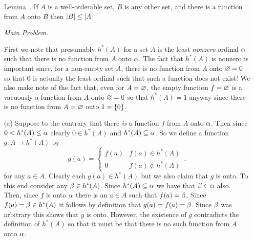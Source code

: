\begin{solution}
    \def\hs{h^*}

    \begin{statement}{Lemma~\ex.}
        If $A$ is a well-orderable set, $B$ is any other set, and there is a function from $A$ onto $B$ then $\left| B \right| \leq \left| A \right|$.
    \end{statement}


    \emph{Main Problem.}

    First we note that presumably $\hs(A)$ for a set $A$ is the least \emph{nonzero} ordinal $\alpha$ such that there is no function from $A$ onto $\alpha$.
    The fact that $\hs(A)$ is nonzero is important since, for a non-empty set $A$, there is no function from $A$ onto $\varnothing = 0$ so that $0$ is actually the least ordinal such that such a function does not exist!
    We also make note of the fact that, even for $A=\varnothing$, the empty function $f = \varnothing$ is a vacuously a function from $A$ onto $\varnothing = 0$ so that $\hs(A) = 1$ anyway since there is no function from $A = \varnothing$ onto $1 = \left\{ 0 \right\}$.

	(a) Suppose to the contrary that there \emph{is} a function $f$ from $A$ onto $\alpha$.
    Then since $0 < \hs(A) \leq \a$ clearly $0 \in \hs(A)$ and $\hs(A) \ss \a$.
    So we define a function $g : A \to \hs(A)$ by
    $$
    g(a) = \begin{cases}
         f(a) & f(a) \in \hs(A) \\
         0 & f(a) \notin \hs(A)
    \end{cases} \,.
    $$
    for any $a \in A$.
    Clearly each $g(a) \in \hs(A)$ but we also claim that $g$ is onto.
    To this end consider any $\b \in \hs(A)$.
    Since $\hs(A) \ss \a$ we have that $\beta \in \alpha$ also.
    Then, since $f$ is onto $\alpha$ there is an $a \in A$ such that $f(a) = \beta$.
    Since $f(a) = \b \in \hs(A)$ it follows by definition that $g(a) = f(a) = \beta$.
    Since $\beta$ was arbitrary this shows that $g$ is onto.
    However, the existence of $g$  contradicts the definition of $\hs(A)$ so that it must be that there is no such function from $A$ onto $\alpha$. \qedsymbol


\end{solution}
